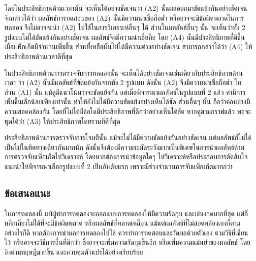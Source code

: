 โดยในประสิทธิภาพด้านเวลานั้น จะเห็นได้อย่างชัดเจนว่า (A2) นั้นผลออกมาขัดแย้งกันอย่างชัดเจน จึงกล่าวได้ว่า ผลลัพธ์การทดสอบของ (A2) นั้นมีความน่าเชื่อถือต่ำ
หรืออาจจะมีข้อผิดพลาดในการทดลอง จึงไม่อาจจะนำ (A2) ไปใช้ในการวิเคราะห์อื่นๆ ได้
ส่วนในผลลัพธ์อื่นๆ นั้น จะเห็นว่าทั้ง 2 รูปแบบไม่ได้ขัดแย้งกันอย่างชัดเจน ผลลัพธ์จึงมีความน่าเชื่อถือ
โดย (A4) นั้นมีประสิทธิภาพที่ดีขึ้นเมื่อแพ็กเก็ตมีจำนวนเพิ่มขึ้น ส่วนที่เหลือนั้นไม่ได้มีความต่างอย่างชัดเจน
สามารถกล่าวได้ว่า (A4) ให้ประสิทธิภาพด้านเวลาดีที่สุด

ในประสิทธิภาพด้านการตรวจจับการทดลองนั้น จะเห็นได้อย่างชัดเจนเช่นเดียวกับประสิทธิภาพด้านเวลา ว่า (A2) นั้นมีผลลัพธ์ที่ขัดแย้งกันจากทัง 2 รูปแบบ ดังนั้น (A2) จึงมีความน่าเชื่อถือต่ำ
ในส่วน (A1) นั้น แม้ดูมีแนวโน้มว่าจะขัดแย้งกัน แต่เมื่อพิจารณาผลลัพธ์ในรูปแบบที่ 2 แล้ว ค่ามีการเพิ่มขึ้นเล็กน้อยเพียงเท่านั้น ทำให้ยังไม่ได้มีความขัดแย้งอย่างเห็นได้ชัด
ส่วนอื่นๆ นั้น ถือว่าค่อนข้างมีความสอดคล้องกัน โดยที่ไม่ได้มีข้อใดมีประสิทธิภาพที่ดีกว่าอย่างเห็นได้ชัด หากดูตามกราฟแล้ว พอจะพูดได้ว่า (A3) ให้ประสิทธิภาพโดยรวมที่ดีที่สุด

ประสิทธิภาพด้านการตรวจจับการโจมตีนั้น แม้จะไม่ได้มีความขัดแย้งกันอย่างชัดเจน แต่ผลลัพธ์ก็ไม่ได้เป็นไปในทิศทางเดียวกันมากนัก ดังนั้นจึงต้องมีความระมัดระวังมากเป็นพิเศษในการนำผลลัพธ์ด้านการตรวจจับแพ็กเก็ตไปวิเคราะห์ โดยหากต้องการนำข้อมูลใดๆ ไปวิเคราะห์หรือประกอบการตัดสินใจ แนะนำให้พิจารณาเลือกรูปแบบที่ 2 เป็นอันดับแรก
เพราะมีช่วงจำนวนการจับแพ็กเก็ตมากกว่า
\\
\subsection{ข้อเสนอแนะ}

ในการทดลองนี้ แม้ผู้ทำการทดลองจะออกแบบการทดลองให้มีความรัดกุม และเข้มงวดมากที่สุด
แต่ก็หลีกเลี่ยงไม่ได้ที่จะมีข้อผิดพลาด หรือผลลัพธ์ที่คลาดเคลื่อน แม้แต่ผลลัพธ์ที่ไม่สอดคล้องเองก็ตาม
อย่างไรก็ดี หากต้องการนำผลการทดลองไปใช้ ควรทำการทดสอบและวัดผลด้วยตัวเอง ตามวิธีที่เขียนไว้ หรืออาจจะวิธีการอื่นที่ดีกว่า ซึ่งอาจจะเพิ่มความรัดกุมขึ้นอีก
หรือเพิ่มความแม่นยำของผลลัพธ์ โดยอิงตามทฤษฎีมากขึ้น และควบคุมตัวแปรได้อย่างเรียบร้อย